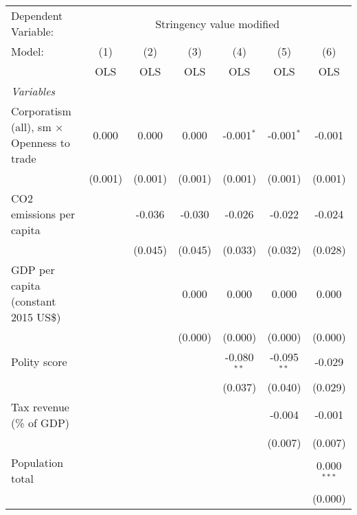 
\begingroup
\centering
\begin{tabular}{lcccccc}
   \toprule
   Dependent Variable: & \multicolumn{6}{c}{Stringency value modified}\\
   Model:                                            & (1)     & (2)     & (3)     & (4)           & (5)           & (6)\\  
                                                     &  OLS    & OLS     & OLS     & OLS           & OLS           & OLS\\  
   \midrule
   \emph{Variables}\\
   Corporatism (all), sm $\times$ Openness to trade  & 0.000   & 0.000   & 0.000   & -0.001$^{*}$  & -0.001$^{*}$  & -0.001\\   
                                                     & (0.001) & (0.001) & (0.001) & (0.001)       & (0.001)       & (0.001)\\   
   CO2 emissions per capita                          &         & -0.036  & -0.030  & -0.026        & -0.022        & -0.024\\   
                                                     &         & (0.045) & (0.045) & (0.033)       & (0.032)       & (0.028)\\   
   GDP per capita (constant 2015 US\$)               &         &         & 0.000   & 0.000         & 0.000         & 0.000\\   
                                                     &         &         & (0.000) & (0.000)       & (0.000)       & (0.000)\\   
   Polity score                                      &         &         &         & -0.080$^{**}$ & -0.095$^{**}$ & -0.029\\   
                                                     &         &         &         & (0.037)       & (0.040)       & (0.029)\\   
   Tax revenue (\% of GDP)                           &         &         &         &               & -0.004        & -0.001\\   
                                                     &         &         &         &               & (0.007)       & (0.007)\\   
   Population total                                  &         &         &         &               &               & 0.000$^{***}$\\   
                                                     &         &         &         &               &               & (0.000)\\   

\end{tabular}
